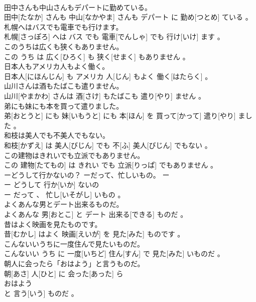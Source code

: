 \documentclass[8pt]{extreport}
\begin{document}
\begin{CJK}{UTF8}{min}
\\	田中さんも中山さんもデパートに勤めている。	
\\	田中[たなか] さんも 中山[なかやま] さんも デパート に 勤め[つとめ] ている 。
\\	札幌へはバスでも電車でも行けます。	
\\	札幌[さっぽろ] へは バス でも 電車[でんしゃ] でも 行け[いけ] ます 。
\\	このうちは広くも狭くもありません。	
\\	この うち は 広く[ひろく] も 狭く[せまく] もありません 。
\\	日本人もアメリカ人もよく働く。	
\\	日本人[にほんじん] も アメリカ 人[じん] もよく 働く[はたらく] 。
\\	山川さんは酒もたばこも遣りません。	
\\	山川[やまかわ] さんは 酒[さけ] もたばこも 遣り[やり] ません 。
\\	弟にも妹にも本を買って遣りました。	
\\	弟[おとうと] にも 妹[いもうと] にも 本[ほん] を 買って[かって] 遣り[やり] ました 。
\\	和枝は美人でも不美人でもない。	
\\	和枝[かずえ] は 美人[びじん] でも 不[ふ] 美人[びじん] でもない 。
\\	この建物はきれいでも立派でもありません。	
\\	この 建物[たてもの] は きれい でも 立派[りっぱ] でもありません 。
\\	ーどうして行かないの？ ーだって、忙しいもの。	ー
\\	ー どうして 行か[いか] ないの 
\\	ー だって 、 忙し[いそがし] いもの 。
\\	よくあんな男とデート出来るものだ。	
\\	よくあんな 男[おとこ] と デート 出来る[できる] ものだ 。
\\	昔はよく映画を見たものです。	
\\	昔[むかし] はよく 映画[えいが] を 見た[みた] ものです 。
\\	こんないいうちに一度住んで見たいものだ。	
\\	こんないい うち に 一度[いちど] 住ん[すん] で 見た[みた] いものだ 。
\\	朝人に会ったら「おはよう」と言うものだ。	
\\	朝[あさ] 人[ひと] に 会った[あった] ら 
\\	おはよう 
\\	と 言う[いう] ものだ 。

\end{CJK}
\end{document}
